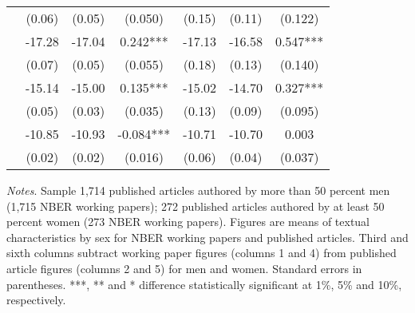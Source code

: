 \begin{table}
\begin{threeparttable}
\begin{tabular}{p{4cm}S@{}S@{}S[round-precision=3]S@{}S@{}S[round-precision=3]}
                                          &      (0.06)&      (0.05)&     (0.050)   &      (0.15)&      (0.11)&     (0.122)   \\
                   &      -17.28&      -17.04&       0.242***&      -17.13&      -16.58&       0.547***\\
                                          &      (0.07)&      (0.05)&     (0.055)   &      (0.18)&      (0.13)&     (0.140)   \\
                          &      -15.14&      -15.00&       0.135***&      -15.02&      -14.70&       0.327***\\
                                          &      (0.05)&      (0.03)&     (0.035)   &      (0.13)&      (0.09)&     (0.095)   \\
                    &      -10.85&      -10.93&      -0.084***&      -10.71&      -10.70&       0.003   \\
                                          &      (0.02)&      (0.02)&     (0.016)   &      (0.06)&      (0.04)&     (0.037)   \\
            \bottomrule
        \end{tabular}
        \begin{tablenotes}
            \tiny
            \item \textit{Notes}. Sample 1,714 published articles authored by more than 50 percent men (1,715 NBER working papers); 272 published articles authored by at least 50 percent women (273 NBER working papers). Figures are means of textual characteristics by sex for NBER working papers and published articles. Third and sixth columns subtract working paper figures (columns 1 and 4) from published article figures (columns 2 and 5) for men and women. Standard errors in parentheses. ***, ** and * difference statistically significant at 1\%, 5\% and 10\%, respectively.
        \end{tablenotes}
    \end{threeparttable}
\end{table}